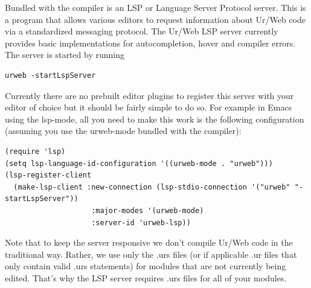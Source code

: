\documentclass{article}
\begin{document}
Bundled with the compiler is an LSP or Language Server Protocol server. This is a program that allows various editors to request information about Ur/Web code via a standardized messaging protocol. The Ur/Web LSP server currently provides basic implementations for autocompletion, hover and compiler errors. The server is started by running
\begin{verbatim}
urweb -startLspServer
\end{verbatim}
Currently there are no prebuilt editor plugins to register this server with your editor of choice but it should be fairly simple to do so. For example in Emacs using the lsp-mode, all you need to make this work is the following configuration (assuming you use the urweb-mode bundled with the compiler):
\begin{verbatim}
(require 'lsp)
(setq lsp-language-id-configuration '((urweb-mode . "urweb")))
(lsp-register-client
  (make-lsp-client :new-connection (lsp-stdio-connection '("urweb" "-startLspServer"))
                    :major-modes '(urweb-mode)
                    :server-id 'urweb-lsp))
\end{verbatim}
Note that to keep the server responsive we don't compile Ur/Web code in the traditional way. Rather, we use only the .urs files (or if applicable .ur files that only contain valid .urs statements) for modules that are not currently being edited. That's why the LSP server requires .urs files for all of your modules.

\medskip
\end{document}
